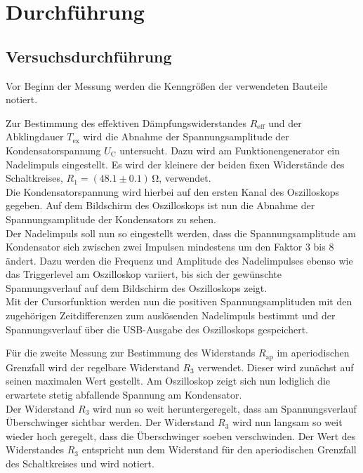 \section{Durchführung}
\label{sec:Durchführung}



\subsection{Versuchsdurchführung}
\label{sec:Versuchsbeschreibung}

Vor Beginn der Messung werden die Kenngrößen der verwendeten Bauteile notiert.

Zur Bestimmung des effektiven Dämpfungswiderstandes $R_\text{eff}$ und der Abklingdauer $T_\text{ex}$ wird die Abnahme der Spannungsamplitude der Kondensatorspannung $U_\text{C}$ untersucht.
Dazu wird am Funktionengenerator ein Nadelimpuls eingestellt.
Es wird der kleinere der beiden fixen Widerstände des Schaltkreises, $R_\text{1}=(48.1 \pm 0.1)\,\si{\ohm}$, verwendet. \\
Die Kondensatorspannung wird hierbei auf den ersten Kanal des Oszilloskops gegeben.
Auf dem Bildschirm des Oszilloskops ist nun die Abnahme der Spannungsamplitude der Kondensators zu sehen.\\
Der Nadelimpuls soll nun so eingestellt werden, dass die Spannungsamplitude am Kondensator sich zwischen zwei Impulsen mindestens um den Faktor 3 bis 8 ändert.
Dazu werden die Frequenz und Amplitude des Nadelimpulses ebenso wie das Triggerlevel am Oszilloskop variiert, bis sich der gewünschte Spannungsverlauf auf dem Bildschirm des Oszilloskops zeigt.\\
Mit der Cursorfunktion werden nun die positiven Spannungsamplituden mit den zugehörigen Zeitdifferenzen zum auslösenden Nadelimpuls bestimmt und der Spannungsverlauf über die USB-Ausgabe des Oszilloskops gespeichert.


Für die zweite Messung zur Bestimmung des Widerstands $R_\text{ap}$ im aperiodischen Grenzfall wird der regelbare Widerstand $R_\text{3}$ verwendet.
Dieser wird zunächst auf seinen maximalen Wert gestellt. Am Oszilloskop zeigt sich nun lediglich die erwartete stetig abfallende Spannung am Kondensator. \\
Der Widerstand $R_\text{3}$ wird nun so weit heruntergeregelt, dass am Spannungsverlauf Überschwinger sichtbar werden.
Der Widerstand $R_\text{3}$ wird nun langsam so weit wieder hoch geregelt, dass die Überschwinger soeben verschwinden. Der Wert des Widerstandes $R_\text{3}$ entspricht nun dem Widerstand für den aperiodischen Grenzfall des Schaltkreises und wird notiert.

